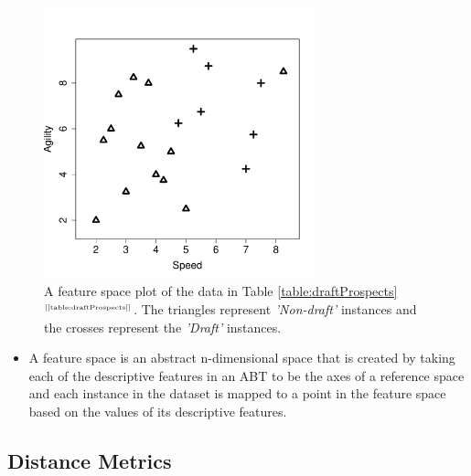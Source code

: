 \documentclass[xcolor={table}]{beamer}
\newcommand{\featL}[1]{\textit{'#1'}}
\newcommand{\ourRef}[1]{\ref{#1} $^{\text{\tiny[\pageref{#1}]}}$}
\begin{document}
 \begin{frame} [plain]
\begin{figure}[htb]
       \begin{centering}
       \includegraphics[width=0.7\textwidth]{images/knn_fs_1.pdf}
       \caption{A feature space plot of the  data in Table \ourRef{table:draftProspects}. The  triangles represent \featL{Non-draft} instances and the crosses represent the \featL{Draft} instances.}
       \label{fig:featurespace}
       \end{centering}
\end{figure}
\end{frame} 

\begin{frame} 
\begin{itemize}
\item A \alert{feature space} is an abstract n-dimensional space that is created by taking each of the descriptive features in an ABT to be the axes of a reference space and each instance in the dataset is mapped to a point in the feature space based on the values of its descriptive features. 
\end{itemize}
\end{frame} 



\subsection{Distance Metrics}
\end{document}
